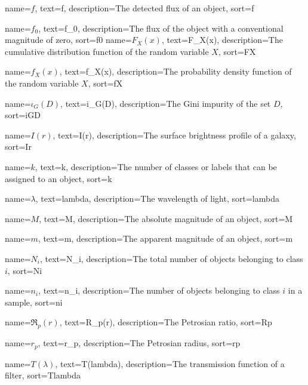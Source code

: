 %
{%
	name={$f$},
	text={f},
	description={The detected flux of an object},
	sort={f}
}

%
{%
	name={$f_0$},
	text={f_0},
	description={The flux of the object with a conventional magnitude of zero},
	sort={f0}
}
%
{%
	name={$F_X(x)$},
	text={F_X(x)},
	description={The cumulative distribution function of the random variable $X$},
	sort={FX}
}

%
{%
	name={$f_X(x)$},
	text={f_X(x)},
	description={The probability density function of the random variable $X$},
	sort={fX}
}

%
{%
	name={$\iota_G(D)$},
	text={i_G(D)},
	description={The Gini impurity of the set $D$},
	sort={iGD}
}

%
{%
	name={$I(r)$},
	text={I(r)},
	description={The surface brightness profile of a galaxy},
	sort={Ir}
}

%
{%
	name={$k$},
	text={k},
	description={The number of classes or labels that can be assigned to an object},
	sort={k}
}

%
{%
	name={$\lambda$},
	text={lambda},
	description={The wavelength of light},
	sort={lambda}
}

%
{%
	name={$M$},
	text={M},
	description={The absolute magnitude of an object},
	sort={M}
}

%
{%
	name={$m$},
	text={m},
	description={The apparent magnitude of an object},
	sort={m}
}

%
{%
	name={$N_i$},
	text={N_i},
	description={The total number of objects belonging to class $i$},
	sort={Ni}
}

%
{%
	name={$n_i$},
	text={n_i},
	description={The number of objects belonging to class $i$ in a sample},
	sort={ni}
}

%
{%
	name={$\mathfrak{R}_p(r)$},
	text={R_p(r)},
	description={The Petrosian ratio},
	sort={Rp}
}

%
{%
	name={$r_p$},
	text={r_p},
	description={The Petrosian radius},
	sort={rp}
}


%
{%
	name={$T(\lambda)$},
	text={T(lambda)},
	description={The transmission function of a filter},
	sort={Tlambda}
}




